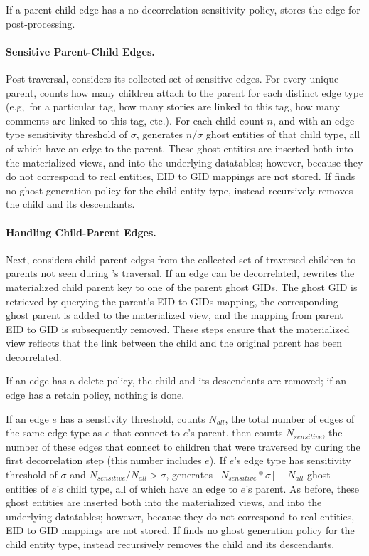 If a parent-child edge has a no-decorrelation-sensitivity policy, \sys stores the edge for
post-processing.

\paragraph{Sensitive Parent-Child Edges.}
Post-traversal, \sys considers its collected set of sensitive edges. For every unique parent,
\sys counts how many children attach to the parent for each distinct edge type (e.g,\ for a
particular tag, how many stories are linked to this tag, how many comments are linked to this tag,
etc.). For each child count $n$, and with an edge type sensitivity threshold of $\sigma$, 
\sys generates $n / \sigma$ ghost entities of that child type, all of which have an edge to the parent.
These ghost entities are inserted both into the materialized views, and into the underlying
datatables; however, because they do not correspond to real entities, EID to GID mappings are not
stored. 
If \sys finds no ghost generation policy for the child entity type, \sys instead recursively
removes the child and its descendants.

\paragraph{Handling Child-Parent Edges.}
Next, \sys considers child-parent edges from the collected set of traversed children to parents
not seen during \sys's traversal. If an 
edge can be decorrelated, \sys rewrites the materialized child parent key to one of the parent
ghost GIDs. The ghost GID is retrieved by querying the parent's EID to GIDs mapping, the
corresponding ghost parent is added to the materialized view,
and the mapping from parent EID to GID is subsequently removed. These steps ensure that the
materialized view reflects that the link between the child and the original parent has been
decorrelated.

If an edge has a delete policy, the child and its descendants are removed; if an edge has a retain
policy, nothing is done. 
%

If an edge $e$ has a senstivity threshold,
\sys counts $N_{all}$, the total number of edges of the same edge type as $e$ that connect to $e$'s parent.
\sys then counts $N_{sensitive}$, the number of these edges that connect to children that were traversed by \sys during the
first decorrelation step (this number includes $e$).
If $e$'s edge type has sensitivity threshold of $\sigma$ and $N_{sensitive} / N_{all} > \sigma$,
\sys generates $\lceil N_{sensitive}*\sigma\rceil - N_{all}$ ghost entities of $e$'s child type, all
of which have an edge to $e$'s parent.
As before, these ghost entities are inserted both into the materialized views, and into the underlying
datatables; however, because they do not correspond to real entities, EID to GID mappings are not
stored. 
If \sys finds no ghost generation policy for the child entity type, \sys instead recursively
removes the child and its descendants.

